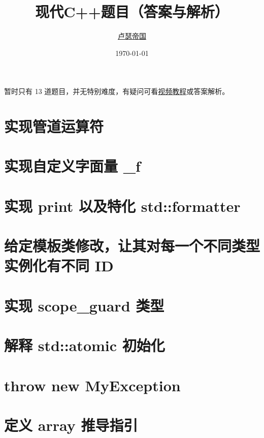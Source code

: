 \documentclass[11pt,fancyhdr]{ctexart}
\title{现代C++题目（答案与解析）}
\author{\href{https://github.com/Mq-b/Loser-HomeWork}{卢瑟帝国}\\}
\date{\today}
\begin{document}
\maketitle

\tableofcontents
\newpage

暂时只有 13 道题目，并无特别难度，有疑问可看\href{https://www.bilibili.com/video/BV1Zj411r7eP/}{视频教程}或答案解析。



\section{实现管道运算符}


\newpage

\section{实现自定义字面量 \_f}


\section{实现 print 以及特化 std::formatter}


\section{给定模板类修改，让其对每一个不同类型实例化有不同 ID}

\section{实现 scope\_guard 类型}

\section{解释 std::atomic 初始化}

\section{throw new MyException}

\section{定义 array 推导指引}
\end{document}
